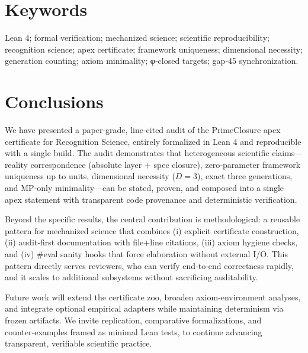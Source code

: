\documentclass{article}
\begin{document}
\section{Keywords}
Lean 4; formal verification; mechanized science; scientific reproducibility; recognition science; apex certificate; framework uniqueness; dimensional necessity; generation counting; axiom minimality; φ‑closed targets; gap‑45 synchronization.

\section{Conclusions}
We have presented a paper‑grade, line‑cited audit of the PrimeClosure apex certificate for Recognition Science, entirely formalized in Lean 4 and reproducible with a single build. The audit demonstrates that heterogeneous scientific claims—reality correspondence (absolute layer + spec closure), zero‑parameter framework uniqueness up to units, dimensional necessity (\(D=3\)), exact three generations, and MP‑only minimality—can be stated, proven, and composed into a single apex statement with transparent code provenance and deterministic verification.

Beyond the specific results, the central contribution is methodological: a reusable pattern for mechanized science that combines (i) explicit certificate construction, (ii) audit‑first documentation with file+line citations, (iii) axiom hygiene checks, and (iv) #eval sanity hooks that force elaboration without external I/O. This pattern directly serves reviewers, who can verify end‑to‑end correctness rapidly, and it scales to additional subsystems without sacrificing auditability.

Future work will extend the certificate zoo, broaden axiom‑environment analyses, and integrate optional empirical adapters while maintaining determinism via frozen artifacts. We invite replication, comparative formalizations, and counter‑examples framed as minimal Lean tests, to continue advancing transparent, verifiable scientific practice.

\end{document}
